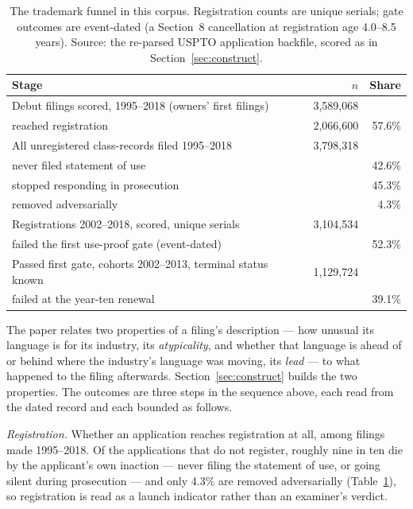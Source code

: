 \begin{table}[h]\centering\small
\caption{The trademark funnel in this corpus. Registration counts are
unique serials; gate outcomes are event-dated (a Section~8 cancellation
at registration age 4.0--8.5 years). Source: the re-parsed USPTO
application backfile, scored as in Section~\ref{sec:construct}.}
\label{tab:funnel}
\begin{tabular}{lrr}
\toprule
Stage & $n$ & Share \\
\midrule
Debut filings scored, 1995--2018 (owners' first filings) & 3{,}589{,}068 & \\
\quad reached registration & 2{,}066{,}600 & 57.6\% \\
\midrule
All unregistered class-records filed 1995--2018 & 3{,}798{,}318 & \\
\quad never filed statement of use & & 42.6\% \\
\quad stopped responding in prosecution & & 45.3\% \\
\quad removed adversarially & & 4.3\% \\
\midrule
Registrations 2002--2018, scored, unique serials & 3{,}104{,}534 & \\
\quad failed the first use-proof gate (event-dated) & & 52.3\% \\
\midrule
Passed first gate, cohorts 2002--2013, terminal status known & 1{,}129{,}724 & \\
\quad failed at the year-ten renewal & & 39.1\% \\
\bottomrule
\end{tabular}
\end{table}

The paper relates two properties of a filing's description --- how unusual
its language is for its industry, its \emph{atypicality}, and whether that
language is ahead of or behind where the industry's language was moving, its
\emph{lead} --- to what happened to the filing afterwards. Section~\ref{sec:construct}
builds the two properties. The outcomes are three steps in the sequence above,
each read from the dated record and each bounded as follows.

\emph{Registration.} Whether an application reaches registration at all,
among filings made 1995--2018. Of the applications that do not register,
roughly nine in ten die by the applicant's own inaction --- never filing the statement of use, or going
silent during prosecution --- and only 4.3\% are removed adversarially
(Table~\ref{tab:funnel}), so registration is read as a launch indicator rather
than an examiner's verdict.

